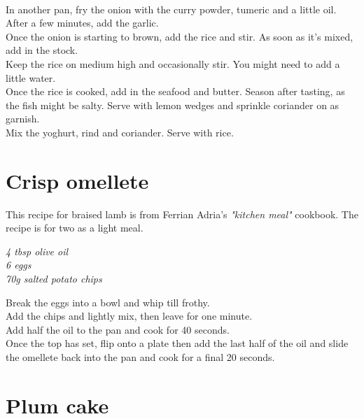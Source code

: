 \documentclass{tufte-book}
\begin{document}
\\In another pan, fry the onion with the curry powder, tumeric and a little oil. After a few minutes, add the garlic.
\\Once the onion is starting to brown, add the rice and stir. As soon as it's mixed, add in the stock. 
\\Keep the rice on medium high and occasionally stir. You might need to add a little water.
\\Once the rice is cooked, add in the seafood and butter. Season after tasting, as the fish might be salty. Serve with lemon wedges and sprinkle coriander on as garnish.
\\Mix the yoghurt, rind and coriander. Serve with rice.


\section{Crisp omellete}

This recipe for braised lamb is from Ferrian Adria's \emph{"kitchen meal"} cookbook. The recipe is for two as a light meal. 

\smallskip
\emph{4 tbsp olive oil
\\6 eggs
\\70g salted potato chips
}

\smallskip
Break the eggs into a bowl and whip till frothy.
\\Add the chips and lightly mix, then leave for one minute.
\\Add half the oil to the pan and cook for 40 seconds.
\\Once the top has set, flip onto a plate then add the last half of the oil and slide the omellete back into the pan and cook for a final 20 seconds.


\section{Plum cake}
\end{document}
